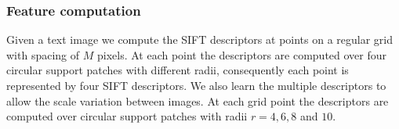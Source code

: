 \subsubsection{Feature computation}
\label{sec:features}


Given a text image we compute the SIFT descriptors at points on a regular grid with spacing of $M$ pixels. At each point the descriptors are computed over four circular support patches with different radii, consequently each point is represented by four SIFT descriptors. We also learn the multiple descriptors to allow the scale variation between images. At each grid point the descriptors are computed over circular support patches with radii $r = 4,6,8$ and $10$.

